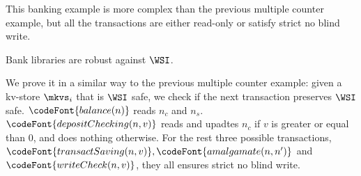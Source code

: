 This banking example is more complex than the previous multiple counter example,
but all the transactions are either read-only or
satisfy strict no blind write.

\begin{theorem}
    Bank libraries  are robust against \( \WSI \).
\end{theorem}

We prove it in a similar way to the previous multiple counter example: given a kv-store \( \mkvs_i \) that is \( \WSI \) safe,
we check if the next transaction preserves \( \WSI \) safe.
\(\codeFont{balance(n)} \) reads \( n_c \) and \( n_s \).
\(\codeFont{depositChecking(n,v)} \) reads and upadtes \( n_c \) if \( v \) is greater or equal than 0, and does nothing otherwise.
For the rest three possible transactions, \( \codeFont{transactSaving(n,v)}, \codeFont{amalgamate(n,n')} \) and \( \codeFont{writeCheck(n,v)}\),
they all ensures strict no blind write.

